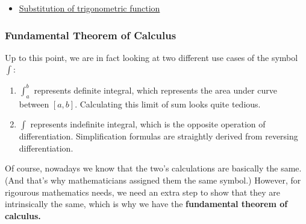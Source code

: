 \documentclass[class=article, crop=false, 12pt]{standalone}
\begin{document}
\begin{itemize}
    \item \ul{Substitution of trigonometric function}
\end{itemize}




\subsubsection{Fundamental Theorem of Calculus}

Up to this point, we are in fact looking at two different use cases of the symbol $\int$:

\begin{enumerate}
    \item $\int_a^b$ represents definite integral, which represents the area under curve between $[a,b]$.
    Calculating this limit of sum looks quite tedious. 

    \item $\int$ represents indefinite integral, which is the opposite operation of differentiation.
    Simplification formulas are straightly derived from reversing differentiation.
\end{enumerate}

Of course, nowadays we know that the two's calculations are basically the same. 
(And that's why mathematicians assigned them the same symbol.) 
However, for rigourous mathematics needs, we need an extra step to show that they are intrinsically the same,
which is why we have the \bf{fundamental theorem of calculus}.
\end{document}
